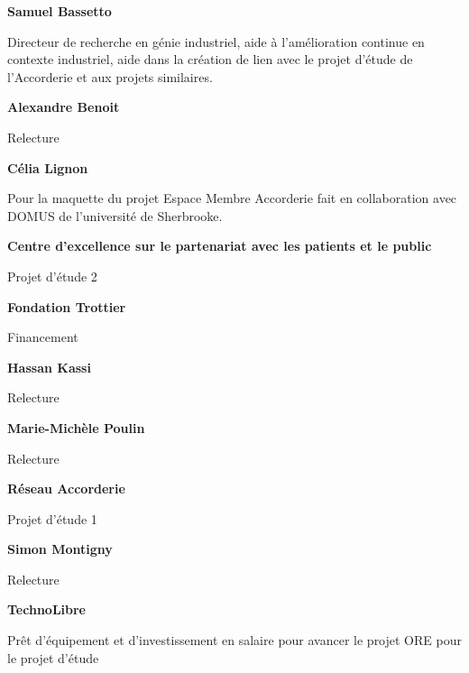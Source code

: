 %

%

\textbf{Samuel Bassetto}

Directeur de recherche en génie industriel, aide à l’amélioration continue en contexte industriel, aide dans la création de lien avec le projet d’étude de l’Accorderie et aux projets similaires.

\textbf{Alexandre Benoit}

Relecture

\textbf{Célia Lignon}

Pour la maquette du projet Espace Membre Accorderie fait en collaboration avec DOMUS de l’université de Sherbrooke.

\textbf{Centre d'excellence sur le partenariat avec les patients et le public}

Projet d’étude 2

\textbf{Fondation Trottier}

Financement

\textbf{Hassan Kassi}

Relecture

\textbf{Marie-Michèle Poulin}

Relecture

\textbf{Réseau Accorderie}

Projet d’étude 1

\textbf{Simon Montigny}

Relecture

\textbf{TechnoLibre}

Prêt d’équipement et d'investissement en salaire pour avancer le projet ORE pour le projet d’étude
